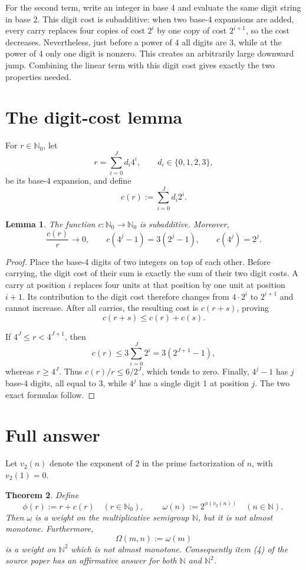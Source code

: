 \documentclass[11pt]{article}
\newtheorem{theorem}{Theorem}
\newtheorem{lemma}[theorem]{Lemma}
\theoremstyle{remark}
\newcommand{\N}{\mathbb N}
\newcommand{\Nzero}{\mathbb N_0}
\newcommand{\vTwo}{v_2}
\begin{document}
For the second term, write an integer in base 4 and evaluate the same digit
string in base 2. This digit cost is subadditive: when two base-4 expansions
are added, every carry replaces four copies of cost $2^i$ by one copy of cost
$2^{i+1}$, so the cost decreases. Nevertheless, just before a power of 4 all
digits are 3, while at the power of 4 only one digit is nonzero. This creates
an arbitrarily large downward jump. Combining the linear term with this digit
cost gives exactly the two properties needed.

\section{The digit-cost lemma}

For $r\in\Nzero$, let
\[
 r=\sum_{i=0}^J d_i4^i,\qquad d_i\in\{0,1,2,3\},
\]
be its base-4 expansion, and define
\[
 c(r):=\sum_{i=0}^Jd_i2^i.
\]

\begin{lemma}\label{lem:cost}
The function $c:\Nzero\to\Nzero$ is subadditive. Moreover,
\[
 \frac{c(r)}r\longrightarrow0,
 \qquad
 c(4^j-1)=3(2^j-1),
 \qquad
 c(4^j)=2^j.
\]
\end{lemma}

\begin{proof}
Place the base-4 digits of two integers on top of each other. Before carrying,
the digit cost of their sum is exactly the sum of their two digit costs. A
carry at position $i$ replaces four units at that position by one unit at
position $i+1$. Its contribution to the digit cost therefore changes from
$4\cdot2^i$ to $2^{i+1}$ and cannot increase. After all carries, the resulting
cost is $c(r+s)$, proving
\[
 c(r+s)\leq c(r)+c(s).
\]

If $4^J\leq r<4^{J+1}$, then
\[
 c(r)\leq3\sum_{i=0}^J2^i=3(2^{J+1}-1),
\]
whereas $r\geq4^J$. Thus $c(r)/r\leq6/2^J$, which tends to zero.
Finally, $4^j-1$ has $j$ base-4 digits, all equal to 3, while $4^j$ has a
single digit 1 at position $j$. The two exact formulas follow.
\end{proof}

\section{Full answer}

Let $\vTwo(n)$ denote the exponent of 2 in the prime factorization of $n$,
with $\vTwo(1)=0$.

\begin{theorem}\label{thm:answer}
Define
\[
 \phi(r):=r+c(r)\quad(r\in\Nzero),
 \qquad
 \boxed{\ \omega(n):=2^{\phi(\vTwo(n))}\quad(n\in\N).\ }
\]
Then $\omega$ is a weight on the multiplicative semigroup $\N$, but it is not
almost monotone. Furthermore,
\[
 \Omega(m,n):=\omega(m)
\]
is a weight on $\N^2$ which is not almost monotone. Consequently item (4) of
the source paper has an affirmative answer for both $\N$ and $\N^2$.
\end{theorem}
\end{document}
